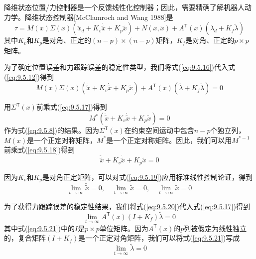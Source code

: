\documentclass[12pt,a4paper]{ctexart}
\begin{document}
降维状态位置/力控制器是一个反馈线性化控制器；因此，需要精确了解机器人动力学。降维状态控制器[McClamroch and Wang 1988]是
\begin{equation}\label{eq:9.5.16}
\tau = M(x)\Sigma(x)(\ddot{x}_d + K_v\dot{\tilde{x}} + K_p \tilde{x}) + N(x, \dot{x}) + A^{\mathsf T}(x)(\lambda_d + K_f \tilde{\lambda})
\end{equation}
其中$K_v$和$K_p$是对角、正定的$(n - p) \times (n - p)$矩阵，$K_f$是对角、正定的$p \times p$矩阵。

为了确定位置误差和力跟踪误差的稳定性类型，我们将式(\ref{eq:9.5.16})代入式(\ref{eq:9.5.12})得到
\begin{equation}\label{eq:9.5.17}
M(x)\Sigma(x)(\ddot{\tilde{x}} + K_v\dot{\tilde{x}} + K_p \tilde{x}) + A^{\mathsf T}(x)(\tilde{\lambda} + K_f \tilde{\lambda}) = 0
\end{equation}

用$\Sigma^{\mathsf T}(x)$前乘式(\ref{eq:9.5.17})得到
\begin{equation}\label{eq:9.5.18}
M^*(\ddot{\tilde{x}} + K_v\dot{\tilde{x}} + K_p \tilde{x}) = 0
\end{equation}
作为式(\ref{eq:9.5.8})的结果。因为$\Sigma^{\mathsf T}(x)$在约束空间运动中包含$n - p$个独立列，$M(x)$是一个正定对称矩阵，$M^*$是一个正定对称矩阵。因此，我们可以用$M^{*-1}$前乘式(\ref{eq:9.5.18})得到
\begin{equation}\label{eq:9.5.19}
\ddot{\tilde{x}} + K_v\dot{\tilde{x}} + K_p \tilde{x} = 0
\end{equation}

因为$K_v$和$K_p$是对角正定矩阵，可以对式(\ref{eq:9.5.19})应用标准线性控制论证，得到
\begin{equation}\label{eq:9.5.20}
\lim_{t \to \infty} \ddot{\tilde{x}} = 0, \quad \lim_{t \to \infty} \dot{\tilde{x}} = 0, \quad \lim_{t \to \infty} \tilde{x} = 0
\end{equation}

为了获得力跟踪误差的稳定性结果，我们将式(\ref{eq:9.5.20})代入式(\ref{eq:9.5.17})得到
\begin{equation}\label{eq:9.5.21}
\lim_{t \to \infty} A^{\mathsf T}(x)(I + K_f)\tilde{\lambda} = 0
\end{equation}
其中式(\ref{eq:9.5.21})中的$I$是$p \times p$单位矩阵。因为$A^{\mathsf T}(x)$的$p$列被假定为线性独立的，复合矩阵$(I + K_f)$是一个正定对角矩阵，我们可以将式(\ref{eq:9.5.21})写成
\begin{equation}\label{eq:9.5.22}
\lim_{t \to \infty} \tilde{\lambda} = 0
\end{equation}
\end{document}

